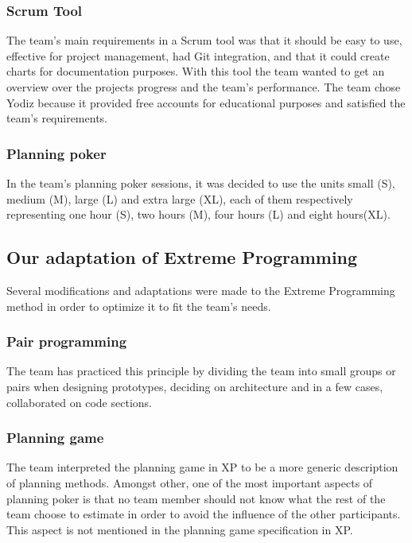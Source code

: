 \subsubsection{Scrum Tool}
\label{sec:scrumtool}
The team's main requirements in a Scrum tool was that it should be easy to use, effective for project management, had Git integration, and that it could create charts for documentation purposes. With this tool the team wanted to get an overview over the projects progress and the team's performance. The team chose Yodiz because it provided free accounts for educational purposes and satisfied the team's requirements.

\subsubsection{Planning poker}
In the team's planning poker sessions, it was decided to use the units small (S), medium (M), large (L) and extra large (XL), each of them respectively representing one hour (S), two hours (M), four hours (L) and eight hours(XL).

\subsection{Our adaptation of Extreme Programming}
\label{sec:adapExtremeProgr}
Several modifications and adaptations were made to the Extreme Programming method in order to optimize it to fit the team's needs.

\subsubsection{Pair programming}
The team has practiced this principle by dividing the team into small groups or pairs when designing prototypes, deciding on architecture and in a few cases, collaborated on code sections.

\subsubsection{Planning game}
The team interpreted the planning game in XP to be a more generic description of planning methods.  Amongst other, one of the most important aspects of planning poker is that no team member should not know what the rest of the team choose to estimate in order to avoid the influence of the other participants. This aspect is not mentioned in the planning game specification in XP.

